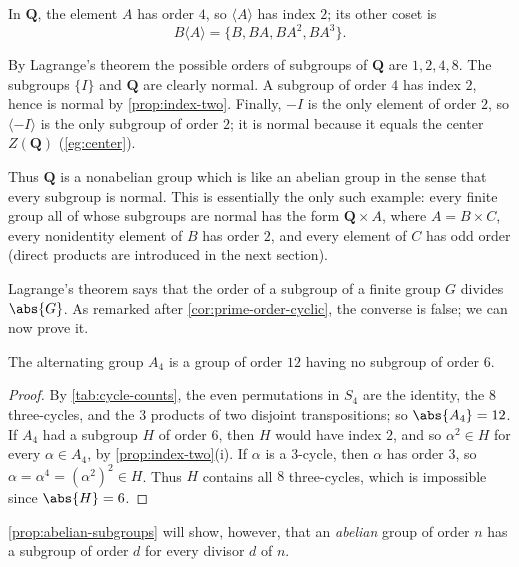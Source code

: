 In \(\mathbf Q\), the element \(A\) has order \(4\), so \(\langle A\rangle\) has index
\(2\); its other coset is
\[
	B\langle A\rangle = \{B, BA, BA^2, BA^3\}.
\]

\begin{eg}\label{eg:Q-subgroups-normal}
	By Lagrange's theorem the possible orders of subgroups of \(\mathbf Q\) are \(1, 2, 4,
	8\). The subgroups \(\{I\}\) and \(\mathbf Q\) are clearly normal. A subgroup of order
	\(4\) has index \(2\), hence is normal by \autoref{prop:index-two}. Finally, \(-I\) is
	the only element of order \(2\), so \(\langle -I\rangle\) is the only subgroup of order
	\(2\); it is normal because it equals the center \(Z(\mathbf Q)\)
	(\autoref{eg:center}).
\end{eg}

Thus \(\mathbf Q\) is a nonabelian group which is like an abelian group in the sense that
every subgroup is normal. This is essentially the only such example: every finite group
all of whose subgroups are normal has the form \(\mathbf Q \times A\), where
\(A = B \times C\), every nonidentity element of \(B\) has order \(2\), and every element
of \(C\) has odd order (direct products are introduced in the next section).

Lagrange's theorem says that the order of a subgroup of a finite group \(G\) divides
\(\abs{G}\). As remarked after \autoref{cor:prime-order-cyclic}, the converse is false; we
can now prove it.

\begin{proposition}\label{prop:A4-no-6}
	The alternating group \(A_4\) is a group of order \(12\) having no subgroup of order
	\(6\).
\end{proposition}

\begin{proof}
	By \autoref{tab:cycle-counts}, the even permutations in \(S_4\) are the identity, the
	\(8\) three-cycles, and the \(3\) products of two disjoint transpositions; so
	\(\abs{A_4} = 12\). If \(A_4\) had a subgroup \(H\) of order \(6\), then \(H\) would have
	index \(2\), and so \(\alpha^2 \in H\) for every \(\alpha \in A_4\), by
	\autoref{prop:index-two}(i). If \(\alpha\) is a \(3\)-cycle, then \(\alpha\) has order
	\(3\), so \(\alpha = \alpha^4 = (\alpha^2)^2 \in H\). Thus \(H\) contains all \(8\)
	three-cycles, which is impossible since \(\abs{H} = 6\).
\end{proof}

\autoref{prop:abelian-subgroups} will show, however, that an \emph{abelian} group of order
\(n\) has a subgroup of order \(d\) for every divisor \(d\) of \(n\).
